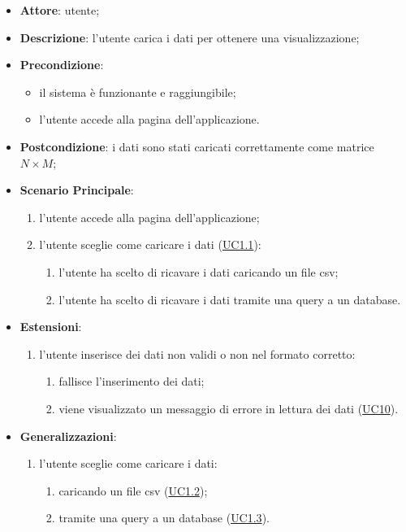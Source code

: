     \begin{itemize}
    \item \textbf{Attore}: utente;
    \item \textbf{Descrizione}: l'utente carica i dati per ottenere una visualizzazione;
    \item \textbf{Precondizione}:
    \begin{itemize}
        \item il sistema è funzionante e raggiungibile;
        \item l'utente accede alla pagina dell'applicazione.
    \end{itemize}
    \item \textbf{Postcondizione}: i dati sono stati caricati correttamente come matrice $N\times M$;
    \item \textbf{Scenario Principale}: 
        \begin{enumerate}
            \item l'utente accede alla pagina dell'applicazione;
            \item l'utente sceglie come caricare i dati (\hyperref[uc1.1]{UC1.1}):
                \begin{enumerate}
                    \item l'utente ha scelto di ricavare i dati caricando un file csv;
                    \item l'utente ha scelto di ricavare i dati tramite una query a un database.
                \end{enumerate}
        \end{enumerate}  
    \item \textbf{Estensioni}:
        \begin{enumerate}
            \item l'utente inserisce dei dati non validi o non nel formato corretto:
                \begin{enumerate}
                    \item fallisce l'inserimento dei dati;
                    \item viene visualizzato un messaggio di errore in lettura dei dati (\hyperref[uc10]{UC10}).
                \end{enumerate}
        \end{enumerate}  
    \item \textbf{Generalizzazioni}:
        \begin{enumerate}
            \item l'utente sceglie come caricare i dati:
                \begin{enumerate}
                    \item caricando un file csv (\hyperref[uc1.2]{UC1.2});
                    \item tramite una query a un database (\hyperref[uc1.3]{UC1.3}).
                \end{enumerate}
        \end{enumerate}  
    \end{itemize}
    
